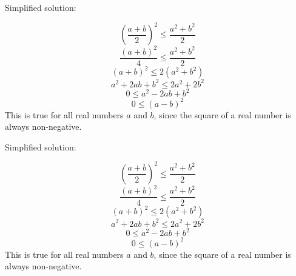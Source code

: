 \documentclass{article}
\begin{document}
Simplified solution:
\begin{tcolorbox}[colback=blue!10, width=\linewidth]
\[
\left(\frac{a+b}{2}\right)^2 \leq \frac{a^2+b^2}{2}
\]
\[
\frac{(a+b)^2}{4} \leq \frac{a^2+b^2}{2}
\]
\[
(a+b)^2 \leq 2(a^2+b^2)
\]
\[
a^2 + 2ab + b^2 \leq 2a^2 + 2b^2
\]
\[
0 \leq a^2 - 2ab + b^2
\]
\[
0 \leq (a-b)^2
\]
This is true for all real numbers $a$ and $b$, since the square of a real number is always non-negative.

\end{tcolorbox}



Simplified solution:
\begin{tcolorbox}[colback=blue!10, width=\linewidth]
\[
\left(\frac{a+b}{2}\right)^2 \leq \frac{a^2+b^2}{2}
\]
\[
\frac{(a+b)^2}{4} \leq \frac{a^2+b^2}{2}
\]
\[
(a+b)^2 \leq 2(a^2+b^2)
\]
\[
a^2 + 2ab + b^2 \leq 2a^2 + 2b^2
\]
\[
0 \leq a^2 - 2ab + b^2
\]
\[
0 \leq (a-b)^2
\]
This is true for all real numbers $a$ and $b$, since the square of a real number is always non-negative.

\end{tcolorbox}
\end{document}
